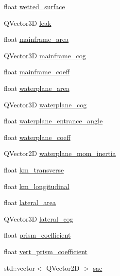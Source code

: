 \begin{DoxyCompactItemize}
float \hyperlink{structShipCAD_1_1HydrostaticsData_ad4b78176732ea80000adb94b5b5669f3}{wetted\+\_\+surface}
\item 
Q\+Vector3D \hyperlink{structShipCAD_1_1HydrostaticsData_a1132babc4274499418c2dc8ea6f86314}{leak}
\item 
float \hyperlink{structShipCAD_1_1HydrostaticsData_ab2b49d5dea89ae998116c8ff4cac2b53}{mainframe\+\_\+area}
\item 
Q\+Vector3D \hyperlink{structShipCAD_1_1HydrostaticsData_ab726ebe5c185d197a25e4477576266a4}{mainframe\+\_\+cog}
\item 
float \hyperlink{structShipCAD_1_1HydrostaticsData_a4208b97fe6110516d71e67708186897a}{mainframe\+\_\+coeff}
\item 
float \hyperlink{structShipCAD_1_1HydrostaticsData_a5f3432f4d790bbb9c4d75502cb15b7f0}{waterplane\+\_\+area}
\item 
Q\+Vector3D \hyperlink{structShipCAD_1_1HydrostaticsData_ac100876d13ae75147585c5c0f80801fe}{waterplane\+\_\+cog}
\item 
float \hyperlink{structShipCAD_1_1HydrostaticsData_a3e22cf4f03f02a3c0d14e7f66610fd80}{waterplane\+\_\+entrance\+\_\+angle}
\item 
float \hyperlink{structShipCAD_1_1HydrostaticsData_a4d5eb630367999a611b95dd0d2c2242c}{waterplane\+\_\+coeff}
\item 
Q\+Vector2D \hyperlink{structShipCAD_1_1HydrostaticsData_a2a662521564e9c0160c15acf9d3121f9}{waterplane\+\_\+mom\+\_\+inertia}
\item 
float \hyperlink{structShipCAD_1_1HydrostaticsData_adbadaf4eafa63f1f10778f4c3e1f61a4}{km\+\_\+transverse}
\item 
float \hyperlink{structShipCAD_1_1HydrostaticsData_a0a51e62f7d169fa892eaabc6a1937256}{km\+\_\+longitudinal}
\item 
float \hyperlink{structShipCAD_1_1HydrostaticsData_a1ba65b28e4351a4d97bc64cd11ddab90}{lateral\+\_\+area}
\item 
Q\+Vector3D \hyperlink{structShipCAD_1_1HydrostaticsData_adc0c4f2f0c5b110a968e45642dc5eeeb}{lateral\+\_\+cog}
\item 
float \hyperlink{structShipCAD_1_1HydrostaticsData_acabee310fcde293fcb0d9a5fd5effe27}{prism\+\_\+coefficient}
\item 
float \hyperlink{structShipCAD_1_1HydrostaticsData_a2a7fc6a194bc1e78ecce8ab16512d1eb}{vert\+\_\+prism\+\_\+coefficient}
\item 
std\+::vector$<$ Q\+Vector2D $>$ \hyperlink{structShipCAD_1_1HydrostaticsData_a503a1f2299db9d5ae923e598b8ee31ba}{sac}
\end{DoxyCompactItemize}


